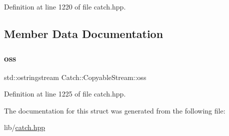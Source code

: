 Definition at line 1220 of file catch.\+hpp.



\subsection{Member Data Documentation}
\hypertarget{struct_catch_1_1_copyable_stream_ae123fb4d673e7d7a13a3c5f6bc5d426c}{}\label{struct_catch_1_1_copyable_stream_ae123fb4d673e7d7a13a3c5f6bc5d426c} 
\subsubsection{\texorpdfstring{oss}{oss}}
{\footnotesize\ttfamily std\+::ostringstream Catch\+::\+Copyable\+Stream\+::oss}



Definition at line 1225 of file catch.\+hpp.



The documentation for this struct was generated from the following file\+:\begin{DoxyCompactItemize}
\item 
lib/\hyperlink{catch_8hpp}{catch.\+hpp}\end{DoxyCompactItemize}
